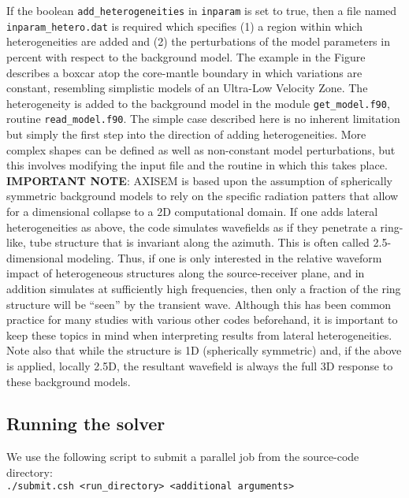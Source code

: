 \documentclass[11pt,letter,fleqn,english,notitlepage]{article}
\begin{document}
If the boolean {\tt add\_heterogeneities} in {\tt inparam} is set to true, then a file named {\tt inparam\_hetero.dat} is required 
which specifies (1) a region within which heterogeneities are added and (2) the perturbations of the model parameters in 
percent with respect to the background model. The example in the Figure describes a boxcar atop the core-mantle boundary
in which variations are constant, resembling simplistic models of an Ultra-Low Velocity Zone. The heterogeneity is added 
to the background model in the module {\tt get\_model.f90}, routine {\tt read\_model.f90}. The simple case described 
here is no inherent limitation but simply the first step into the direction of adding heterogeneities. More complex 
shapes can be defined as well as non-constant model perturbations, but this involves modifying the input file and the routine 
in which this takes place. \\

\noindent \textbf{IMPORTANT NOTE}: AXISEM is based upon the assumption of spherically symmetric background models to 
rely on the specific radiation patters that allow for a dimensional collapse to a 2D computational domain. 
If one adds lateral heterogeneities as above, the code simulates wavefields as if they penetrate a ring-like, tube structure 
that is invariant along the azimuth. This is often called 2.5-dimensional modeling. Thus, if one is only interested in 
the relative waveform impact of heterogeneous structures along the source-receiver plane, and in addition simulates 
at sufficiently high frequencies, then only a fraction of the ring structure will be ``seen'' by the transient wave. Although 
this has been common practice for many studies with various other codes beforehand, it 
is important to keep these topics in mind when interpreting results from lateral heterogeneities. Note also that while 
the structure is 1D (spherically symmetric) and, if the above is applied, locally 2.5D, the resultant wavefield is always 
the full 3D response to these background models.

\subsection{Running the solver}
We use the following script to submit a parallel job from the source-code directory:\\
{\tt ./submit.csh <run\_directory> <additional arguments>}\\
\end{document}
